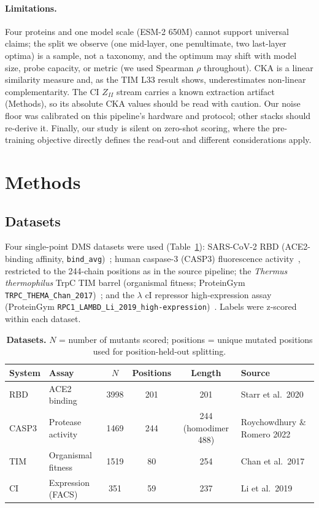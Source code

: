 \documentclass[11pt]{article}
\begin{document}
\paragraph{Limitations.} Four proteins and one model scale (ESM-2 650M) cannot support
universal claims; the split we observe (one mid-layer, one penultimate, two last-layer
optima) is a sample, not a taxonomy, and the optimum may shift with model size, probe
capacity, or metric (we used Spearman $\rho$ throughout). CKA is a linear similarity measure
and, as the TIM L33 result shows, underestimates non-linear complementarity. The CI $Z_{II}$
stream carries a known extraction artifact (Methods), so its absolute CKA values should be
read with caution. Our noise floor was calibrated on this pipeline's hardware and protocol;
other stacks should re-derive it. Finally, our study is silent on zero-shot scoring, where
the pre-training objective directly defines the read-out and different considerations apply.

\section{Methods}

\subsection{Datasets}

Four single-point DMS datasets were used (Table~\ref{tab:data}): SARS-CoV-2 RBD
(ACE2-binding affinity, \texttt{bind\_avg})~\cite{starr2020}; human caspase-3 (CASP3)
fluorescence activity~\cite{roychowdhury2022}, restricted to the 244-chain positions as in
the source pipeline; the \emph{Thermus thermophilus} TrpC TIM barrel
(organismal fitness; ProteinGym \texttt{TRPC\_THEMA\_Chan\_2017})~\cite{chan2017,notin2023};
and the $\lambda$ cI repressor high-expression assay (ProteinGym
\texttt{RPC1\_LAMBD\_Li\_2019\_high-expression})~\cite{li2019,notin2023}. Labels were
z-scored within each dataset.

\begin{table}[t]
\centering
\small
\setlength{\tabcolsep}{4.5pt}
\caption{\textbf{Datasets.} $N$ = number of mutants scored; positions = unique mutated
positions used for position-held-out splitting.}
\label{tab:data}
\footnotesize
\begin{tabular}{llcccl}
\toprule
System & Assay & $N$ & Positions & Length & Source \\
\midrule
RBD   & ACE2 binding        & 3998 & 201 & 201 & Starr et al.\ 2020~\cite{starr2020} \\
CASP3 & Protease activity   & 1469 & 244 & 244 (homo\-dimer 488) & Roychowdhury \& Romero 2022~\cite{roychowdhury2022} \\
TIM   & Organismal fitness  & 1519 & 80  & 254 & Chan et al.\ 2017~\cite{chan2017} \\
CI    & Expression (FACS)   & 351  & 59  & 237 & Li et al.\ 2019~\cite{li2019} \\
\bottomrule
\end{tabular}
\end{table}
\end{document}
